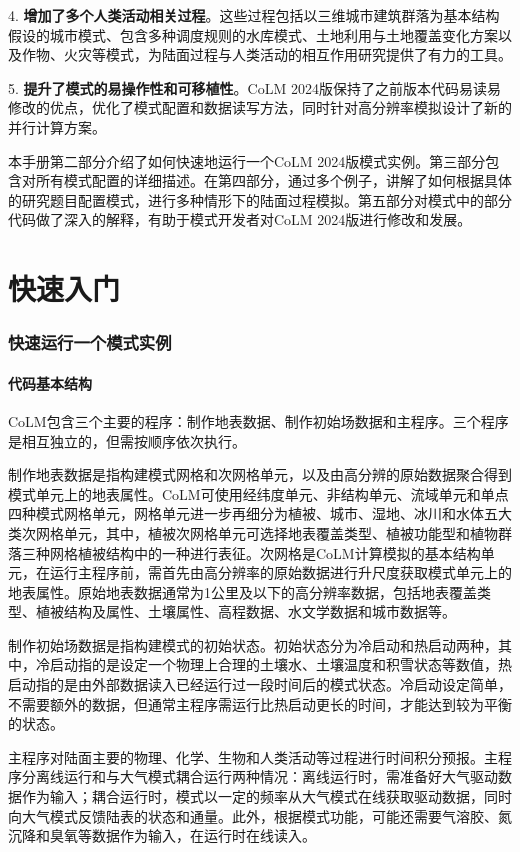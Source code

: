 \documentclass[a4paper,12pt,twoside]{article}
\begin{document}
4. \textbf{增加了多个人类活动相关过程}。这些过程包括以三维城市建筑群落为基本结构假设的城市模式、包含多种调度规则的水库模式、土地利用与土地覆盖变化方案以及作物、火灾等模式，为陆面过程与人类活动的相互作用研究提供了有力的工具。

5. \textbf{提升了模式的易操作性和可移植性}。CoLM 2024版保持了之前版本代码易读易修改的优点，优化了模式配置和数据读写方法，同时针对高分辨率模拟设计了新的并行计算方案。

本手册第二部分介绍了如何快速地运行一个CoLM 2024版模式实例。第三部分包含对所有模式配置的详细描述。在第四部分，通过多个例子，讲解了如何根据具体的研究题目配置模式，进行多种情形下的陆面过程模拟。第五部分对模式中的部分代码做了深入的解释，有助于模式开发者对CoLM 2024版进行修改和发展。

\clearpage

\part{快速入门}
\section{快速运行一个模式实例}\label{chapter01}

\subsection{代码基本结构}

CoLM包含三个主要的程序：制作地表数据、制作初始场数据和主程序。三个程序是相互独立的，但需按顺序依次执行。

制作地表数据是指构建模式网格和次网格单元，以及由高分辨的原始数据聚合得到模式单元上的地表属性。CoLM可使用经纬度单元、非结构单元、流域单元和单点四种模式网格单元，网格单元进一步再细分为植被、城市、湿地、冰川和水体五大类次网格单元，其中，植被次网格单元可选择地表覆盖类型、植被功能型和植物群落三种网格植被结构中的一种进行表征。次网格是CoLM计算模拟的基本结构单元，在运行主程序前，需首先由高分辨率的原始数据进行升尺度获取模式单元上的地表属性。原始地表数据通常为1公里及以下的高分辨率数据，包括地表覆盖类型、植被结构及属性、土壤属性、高程数据、水文学数据和城市数据等。

制作初始场数据是指构建模式的初始状态。初始状态分为冷启动和热启动两种，其中，冷启动指的是设定一个物理上合理的土壤水、土壤温度和积雪状态等数值，热启动指的是由外部数据读入已经运行过一段时间后的模式状态。冷启动设定简单，不需要额外的数据，但通常主程序需运行比热启动更长的时间，才能达到较为平衡的状态。

主程序对陆面主要的物理、化学、生物和人类活动等过程进行时间积分预报。主程序分离线运行和与大气模式耦合运行两种情况：离线运行时，需准备好大气驱动数据作为输入；耦合运行时，模式以一定的频率从大气模式在线获取驱动数据，同时向大气模式反馈陆表的状态和通量。此外，根据模式功能，可能还需要气溶胶、氮沉降和臭氧等数据作为输入，在运行时在线读入。
\end{document}
